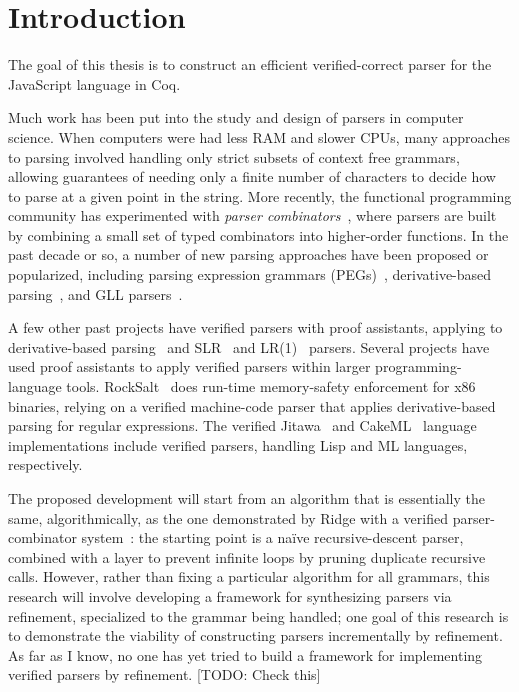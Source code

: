 \documentclass{article}
\begin{document}
\section{Introduction} \label{sec:related}
  The goal of this thesis is to construct an efficient verified-correct parser for the JavaScript language in Coq.
  
  Much work has been put into the study and design of parsers in computer science.  When computers were had less RAM and slower CPUs, many approaches to parsing involved handling only strict subsets of context free grammars, allowing guarantees of needing only a finite number of characters to decide how to parse at a given point in the string.  More recently, the functional programming community has experimented with \emph{parser combinators}~\cite{pcomb}, where parsers are built by combining a small set of typed combinators into higher-order functions.  In the past decade or so, a number of new parsing approaches have been proposed or popularized, including parsing expression grammars (PEGs)~\cite{PEG}, derivative-based parsing~\cite{Derivs}, and GLL parsers~\cite{GLL}.
  
  A few other past projects have verified parsers with proof assistants, applying to derivative-based parsing~\cite{DerivsCoq} and SLR~\cite{SLR} and LR(1)~\cite{LR1} parsers.  Several projects have used proof assistants to apply verified parsers within larger programming-language tools.  RockSalt~\cite{RockSalt} does run-time memory-safety enforcement for x86 binaries, relying on a verified machine-code parser that applies derivative-based parsing for regular expressions.  The verified Jitawa~\cite{Jitawa} and CakeML~\cite{CakeML} language implementations include verified parsers, handling Lisp and ML languages, respectively.
  
  The proposed development will start from an algorithm that is essentially the same, algorithmically, as the one demonstrated by Ridge with a verified parser-combinator system~\cite{Ridge}: the starting point is a na\"ive recursive-descent parser, combined with a layer to prevent infinite loops by pruning duplicate recursive calls.  However, rather than fixing a particular algorithm for all grammars, this research will involve developing a framework for synthesizing parsers via refinement, specialized to the grammar being handled; one goal of this research is to demonstrate the viability of constructing parsers incrementally by refinement.  As far as I know, no one has yet tried to build a framework for implementing verified parsers by refinement. [TODO: Check this]
    
\end{document}
